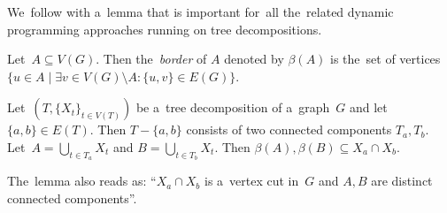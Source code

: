 We~follow with a~lemma that is important for~all the~related
dynamic programming approaches running on tree decompositions.
%
\begin{definition}
	Let~\( A \subseteq V(G) \). Then the~\emph{border} of \( A \) denoted by \( \beta(A) \)
	is the~set of vertices
	\( \{u \in A \mid \exists v \in V(G) \setminus A : {\{u, v\} \in E(G) \}} \).
\end{definition}
%
\begin{lemma}
	Let~\( (T, {\{X_t\}}_{t \in V ( T )}) \)
	be a~tree decomposition of a~graph~\( G \)
	and let~\( \{a, b\} \in E(T) \).
	Then \( T - \{a, b\} \) consists of two connected components \( T_a, T_b \).
	Let~\( A = \bigcup_{t \in T_a} X_t \) and \( B = \bigcup_{t \in T_b} X_t \).
	Then \( \beta(A), \beta(B) \subseteq X_a \cap X_b \).
\end{lemma}
%
The~lemma also reads as:
``\( X_a \cap X_b \) is a~vertex cut in~\( G \) and \( A, B \)
are distinct connected components''.

